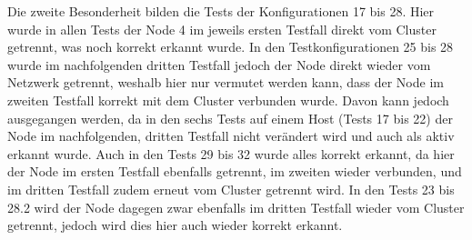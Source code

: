 Die zweite Besonderheit bilden die Tests der Konfigurationen 17 bis 28.
Hier wurde in allen Tests der Node 4 im jeweils ersten Testfall direkt vom Cluster getrennt, was noch korrekt erkannt wurde.
In den Testkonfigurationen 25 bis 28 wurde im nachfolgenden dritten Testfall jedoch der Node direkt wieder vom Netzwerk getrennt, weshalb hier nur vermutet werden kann, dass der Node im zweiten Testfall korrekt mit dem Cluster verbunden wurde.
Davon kann jedoch ausgegangen werden, da in den sechs Tests auf einem Host (Tests 17 bis 22) der Node im nachfolgenden, dritten Testfall nicht verändert wird und auch als aktiv erkannt wurde.
Auch in den Tests 29 bis 32 wurde alles korrekt erkannt, da hier der Node im ersten Testfall ebenfalls getrennt, im zweiten wieder verbunden, und im dritten Testfall zudem erneut vom Cluster getrennt wird.
In den Tests 23 bis 28.2 wird der Node dagegen zwar ebenfalls im dritten Testfall wieder vom Cluster getrennt, jedoch wird dies hier auch wieder korrekt erkannt.
